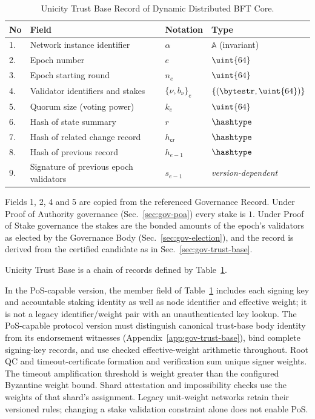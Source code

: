 \begin{table}[!htbp]
	\begin{center}
		\caption{Unicity Trust Base Record of Dynamic Distributed BFT Core.}\label{ta:t-drc}
		\begin{tabular}{|p{0.5cm}|p{8cm}|p{1.7cm}|p{3.5cm}|}\hline
			No & Field                           & Notation       & Type                       \\\hline\hline
			1. & Network instance identifier     & $\alpha$       & $\mathbb{A}$ (invariant)   \\\hline
			2. & Epoch number                    & $e$            & $\uint{64}$                \\\hline
			3. & Epoch starting round            & $n_e$          & $\uint{64}$                \\\hline
			4. & Validator identifiers and stakes& $\{\nu, b_\nu\}_e$& $\{ (\bytestr, \uint{64}) \}$\\\hline
			5. & Quorum size (voting power)      & $k_e$          & $\uint{64}$                \\\hline
			6. & Hash of state summary           & $r$            &  $\hashtype$              \\\hline
			7. & Hash of related change record   & $h_{\mathsf{cr}}$& $\hashtype$             \\\hline
			8. & Hash of previous record         & $h_{e-1}$      & $\hashtype$               \\\hline
			9. & Signature of previous epoch validators & $s_{e-1}$& \textit{version-dependent}\\\hline
		\end{tabular}
	\end{center}
\end{table}

Fields 1, 2, 4 and 5 are copied from the referenced Governance Record. Under Proof of Authority governance (Sec.~\ref{sec:gov-poa}) every stake is $1$. Under Proof of Stake governance the stakes are the bonded amounts of the epoch's validators as elected by the Governance Body (Sec.~\ref{sec:gov-election}), and the record is derived from the certified candidate as in Sec.~\ref{sec:gov-trust-base}.

Unicity Trust Base is a chain of records defined by Table~\ref{ta:t-drc}.

In the PoS-capable version, the member field of Table~\ref{ta:t-drc} includes each signing key and accountable staking identity as well as node identifier and effective weight; it is not a legacy identifier/weight pair with an unauthenticated key lookup. The PoS-capable protocol version must distinguish canonical trust-base body identity from its endorsement witnesses (Appendix~\ref{app:gov-trust-base}), bind complete signing-key records, and use checked effective-weight arithmetic throughout. Root QC and timeout-certificate formation and verification sum unique signer weights. The timeout amplification threshold is weight greater than the configured Byzantine weight bound. Shard attestation and impossibility checks use the weights of that shard's assignment. Legacy unit-weight networks retain their versioned rules; changing a stake validation constraint alone does not enable PoS.


